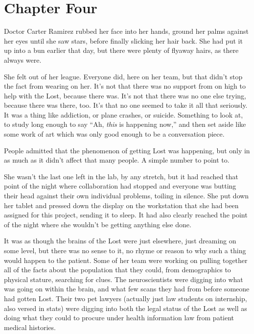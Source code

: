 \chapter*{Chapter Four}

Doctor Carter Ramirez rubbed her face into her hands, ground her palms against her eyes until she saw stars, before finally slicking her hair back.  She had put it up into a bun earlier that day, but there were plenty of flyaway hairs, as there always were.

She felt out of her league.  Everyone did, here on her team, but that didn't stop the fact from wearing on her.  It's not that there was no support from on high to help with the Lost, because there was.  It's not that there was no one else trying, because there was there, too.  It's that no one seemed to take it all that seriously.  It was a thing like addiction, or plane crashes, or suicide.  Something to look at, to study long enough to say ``Ah, \textit{this} is happening now,'' and then set aside like some work of art which was only good enough to be a conversation piece.

People admitted that the phenomenon of getting Lost was happening, but only in as much as it didn't affect that many people.  A simple number to point to.

She wasn't the last one left in the lab, by any stretch, but it had reached that point of the night where collaboration had stopped and everyone was butting their head against their own individual problems, toiling in silence.  She put down her tablet and pressed down the display on the workstation that she had been assigned for this project, sending it to sleep.  It had also clearly reached the point of the night where she wouldn't be getting anything else done.

It was as though the brains of the Lost were just elsewhere, just dreaming on some level, but there was no sense to it, no rhyme or reason to why such a thing would happen to the patient.  Some of her team were working on pulling together all of the facts about the population that they could, from demographics to physical stature, searching for clues.  The neuroscientists were digging into what was going on within the brain, and what few scans they had from before someone had gotten Lost.  Their two pet lawyers (actually just law students on internship, also versed in stats) were digging into both the legal status of the Lost as well as doing what they could to procure under health information law from patient medical histories.

